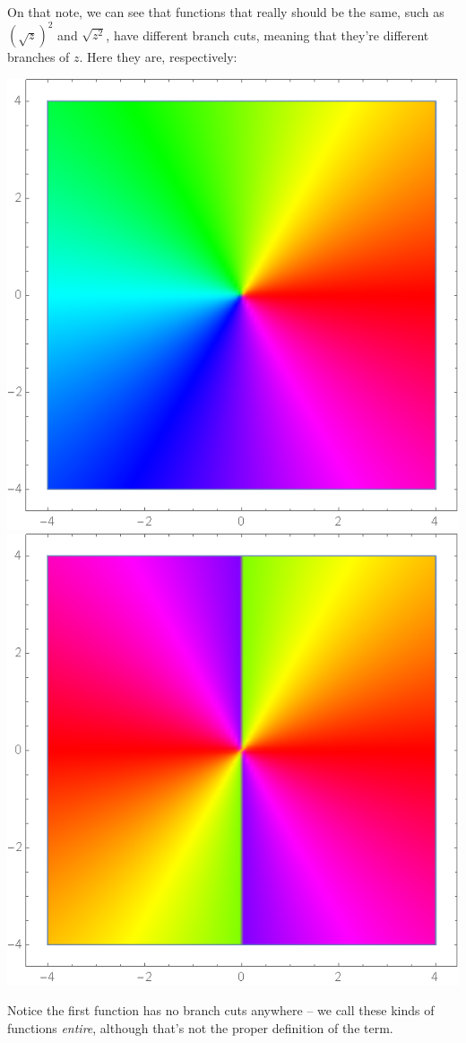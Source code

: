 On that note, we can see that functions that really should be the same, such as $(\sqrt{z})^2$ and $\sqrt{z^2}$, have different branch cuts, meaning that they're different branches of $z$. Here they are, respectively:
\begin{center}
    \includegraphics[scale=0.27]{images/sqrtzsqr1.png}
    \includegraphics[scale=0.27]{images/sqrtzsqr2.png}
\end{center}
Notice the first function has no branch cuts anywhere -- we call these kinds of functions \textit{entire}, although that's not the proper definition of the term.

